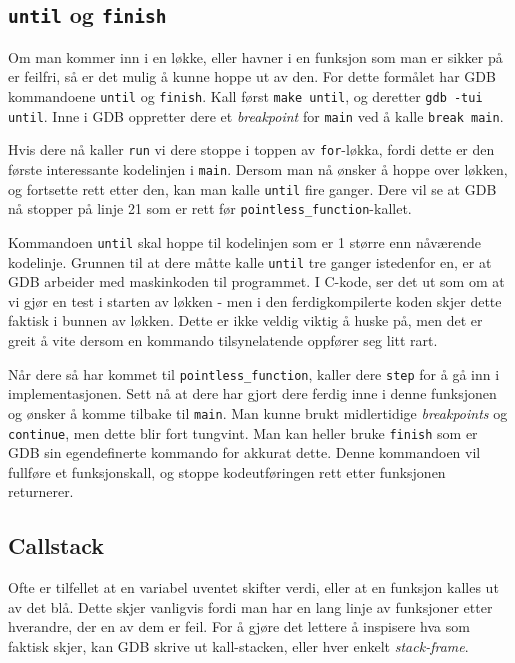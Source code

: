 \subsection{\texttt{until} og \texttt{finish}}

Om man kommer inn i en løkke, eller havner i en funksjon som man er sikker på er feilfri, så er det mulig å kunne hoppe ut av den. For dette formålet har GDB kommandoene \verb|until| og \verb|finish|. Kall først \verb|make until|, og deretter \verb|gdb -tui until|. Inne i GDB oppretter dere et \textit{breakpoint} for \verb|main| ved å kalle \verb|break main|.

Hvis dere nå kaller \verb|run| vi dere stoppe i toppen av \verb|for|-løkka, fordi dette er den første interessante kodelinjen i \verb|main|. Dersom man nå ønsker å hoppe over løkken, og fortsette rett etter den, kan man kalle \verb|until| fire ganger. Dere vil se at GDB nå stopper på linje 21 som er rett før \verb|pointless_function|-kallet.

Kommandoen \verb|until| skal hoppe til kodelinjen som er 1 større enn nåværende kodelinje. Grunnen til at dere måtte kalle \verb|until| tre ganger istedenfor en, er at GDB arbeider med maskinkoden til programmet. I C-kode, ser det ut som om at vi gjør en test i starten av løkken - men i den ferdigkompilerte koden skjer dette faktisk i bunnen av løkken. Dette er ikke veldig viktig å huske på, men det er greit å vite dersom en kommando tilsynelatende oppfører seg litt rart.

Når dere så har kommet til \verb|pointless_function|, kaller dere \verb|step| for å gå inn i implementasjonen. Sett nå at dere har gjort dere ferdig inne i denne funksjonen og ønsker å komme tilbake til \verb|main|. Man kunne brukt midlertidige \textit{breakpoints} og \verb|continue|, men dette blir fort tungvint. Man kan heller bruke \verb|finish| som er GDB sin egendefinerte kommando for akkurat dette. Denne kommandoen vil fullføre et funksjonskall, og stoppe kodeutføringen rett etter funksjonen returnerer.


\subsection{Callstack}


Ofte er tilfellet at en variabel uventet skifter verdi, eller at en funksjon kalles ut av det blå. Dette skjer vanligvis fordi man har en lang linje av funksjoner etter hverandre, der en av dem er feil. For å gjøre det lettere å inspisere hva som faktisk skjer, kan GDB skrive ut kall-stacken, eller hver enkelt \textit{stack-frame}.



